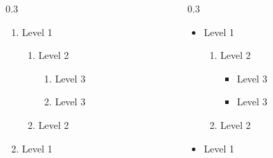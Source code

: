 \begin{frame}
\begin{columns}
\begin{column}[]{0.3\textwidth}
            \begin{enumerate}
                \item Level 1
                \begin{enumerate}
                    \item Level 2
                    \begin{enumerate}
                        \item Level 3
                        \item Level 3
                    \end{enumerate}
                    \item Level 2
                \end{enumerate}
                \item Level 1
            \end{enumerate}
        \end{column}
        \begin{column}[]{0.3\textwidth}
            \begin{itemize}
                \item Level 1
                \begin{enumerate}
                    \item Level 2
                    \begin{itemize}
                        \item Level 3
                        \item Level 3
                    \end{itemize}
                    \item Level 2
                \end{enumerate}
                \item Level 1
            \end{itemize}
        \end{column}
    \end{columns}

\end{frame}

